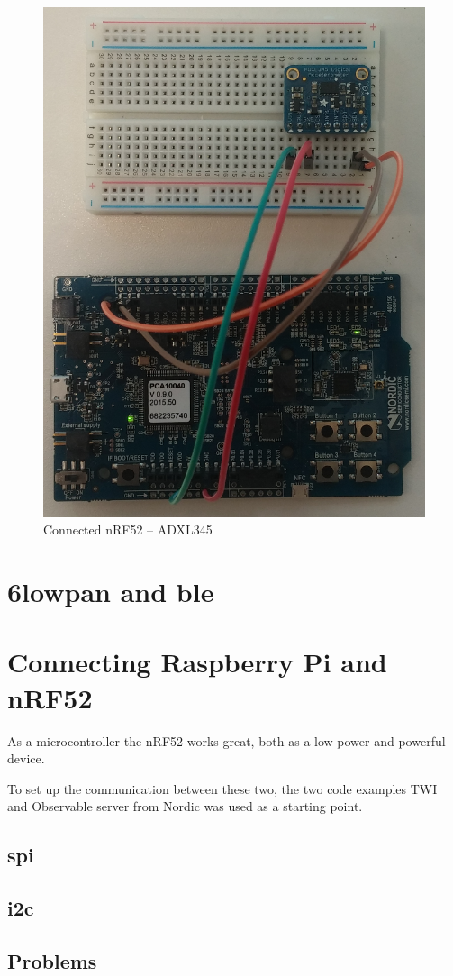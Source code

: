 \begin{figure}[h]
    \centering
    \includegraphics[scale=0.35]{nrf-adxl.png}    \caption{Connected nRF52 -- ADXL345}
    \label{fig:adxl345}
\end{figure}


\section{\gls{6lowpan} and \gls{ble}}



\section{Connecting Raspberry Pi and nRF52}



As a microcontroller the nRF52 works great, both as a low-power and powerful device. 

To set up the communication between these two, the two code examples TWI and Observable server from Nordic was used as a starting point. 


\subsection{\gls{spi}}



\subsection{\gls{i2c}}


\subsection{Problems}




